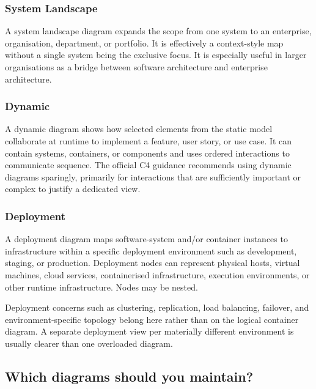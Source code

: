 \documentclass[11pt]{article}
\begin{document}
\subsubsection{System Landscape}

A system landscape diagram expands the scope from one system to an enterprise, organisation, department, or portfolio. It is effectively a context-style map without a single system being the exclusive focus. It is especially useful in larger organisations as a bridge between software architecture and enterprise architecture.\cite{c4landscape}

\subsubsection{Dynamic}

A dynamic diagram shows how selected elements from the static model collaborate at runtime to implement a feature, user story, or use case. It can contain systems, containers, or components and uses ordered interactions to communicate sequence. The official C4 guidance recommends using dynamic diagrams sparingly, primarily for interactions that are sufficiently important or complex to justify a dedicated view.\cite{c4dynamic}

\subsubsection{Deployment}

A deployment diagram maps software-system and/or container instances to infrastructure within a specific deployment environment such as development, staging, or production. Deployment nodes can represent physical hosts, virtual machines, cloud services, containerised infrastructure, execution environments, or other runtime infrastructure. Nodes may be nested.\cite{c4deployment}

Deployment concerns such as clustering, replication, load balancing, failover, and environment-specific topology belong here rather than on the logical container diagram. A separate deployment view per materially different environment is usually clearer than one overloaded diagram.\cite{c4containerdiagram,c4deployment}

\subsection{Which diagrams should you maintain?}
\end{document}
